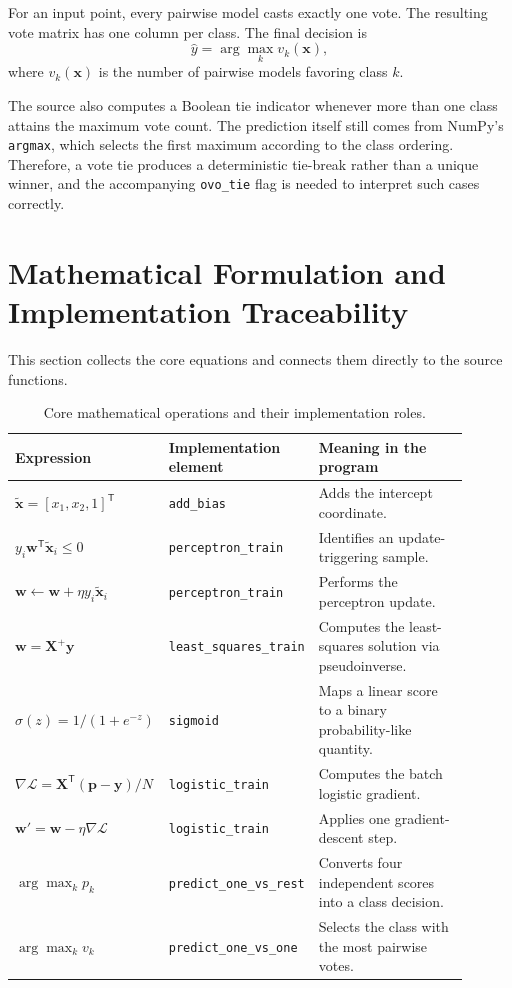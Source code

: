 \documentclass[11pt,a4paper]{article}
\newcommand{\code}[1]{\texttt{#1}}
\begin{document}
For an input point, every pairwise model casts exactly one vote. The resulting vote matrix has one column per class. The final decision is
\begin{equation}
\hat{y}=\arg\max_k v_k(\mathbf{x}),
\end{equation}
where \(v_k(\mathbf{x})\) is the number of pairwise models favoring class \(k\).

The source also computes a Boolean tie indicator whenever more than one class attains the maximum vote count. The prediction itself still comes from NumPy's \code{argmax}, which selects the first maximum according to the class ordering. Therefore, a vote tie produces a deterministic tie-break rather than a unique winner, and the accompanying \code{ovo\_tie} flag is needed to interpret such cases correctly.

\section{Mathematical Formulation and Implementation Traceability}
This section collects the core equations and connects them directly to the source functions.

\begin{table}[ht]
\centering
\caption{Core mathematical operations and their implementation roles.}
\begin{tabular}{p{0.25\linewidth}p{0.28\linewidth}p{0.37\linewidth}}
\toprule
\textbf{Expression} & \textbf{Implementation element} & \textbf{Meaning in the program}\\
\midrule
\(\tilde{\mathbf{x}}=[x_1,x_2,1]^{\mathsf T}\) & \code{add\_bias} & Adds the intercept coordinate.\\
\(y_i\mathbf{w}^{\mathsf T}\tilde{\mathbf{x}}_i\le0\) & \code{perceptron\_train} & Identifies an update-triggering sample.\\
\(\mathbf{w}\leftarrow\mathbf{w}+\eta y_i\tilde{\mathbf{x}}_i\) & \code{perceptron\_train} & Performs the perceptron update.\\
\(\mathbf{w}=\mathbf{X}^{+}\mathbf{y}\) & \code{least\_squares\_train} & Computes the least-squares solution via pseudoinverse.\\
\(\sigma(z)=1/(1+e^{-z})\) & \code{sigmoid} & Maps a linear score to a binary probability-like quantity.\\
\(\nabla\mathcal{L}=\mathbf{X}^{\mathsf T}(\mathbf{p}-\mathbf{y})/N\) & \code{logistic\_train} & Computes the batch logistic gradient.\\
\(\mathbf{w}'=\mathbf{w}-\eta\nabla\mathcal{L}\) & \code{logistic\_train} & Applies one gradient-descent step.\\
\(\arg\max_k p_k\) & \code{predict\_one\_vs\_rest} & Converts four independent scores into a class decision.\\
\(\arg\max_k v_k\) & \code{predict\_one\_vs\_one} & Selects the class with the most pairwise votes.\\
\bottomrule
\end{tabular}
\end{table}
\end{document}
